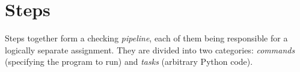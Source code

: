 \section{Steps}\label{sec:steps}

    Steps together form a checking \textit{pipeline}, each of them being responsible for a logically separate assignment.
    They are divided into two categories: \textit{commands} (specifying the program to run) and \textit{tasks}
    (arbitrary Python code).



